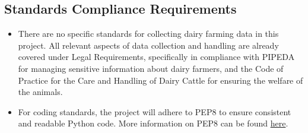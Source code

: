 \documentclass[12pt]{article}
\begin{document}
\subsection{Standards Compliance Requirements}
\begin{itemize}
	\item There are no specific standards for collecting dairy farming data in
	      this project. All relevant aspects of data collection and handling are
	      already covered under Legal Requirements, specifically in compliance
	      with PIPEDA for managing sensitive information about dairy farmers, and
	      the Code of Practice for the Care and Handling of Dairy Cattle for
	      ensuring the welfare of the animals.
	\item For coding standards, the project will adhere to PEP8 to ensure
	      consistent and readable Python code. More information on PEP8 can be
	      found \href{https://peps.python.org/pep-0008/}{here}.
\end{itemize}
\end{document}
